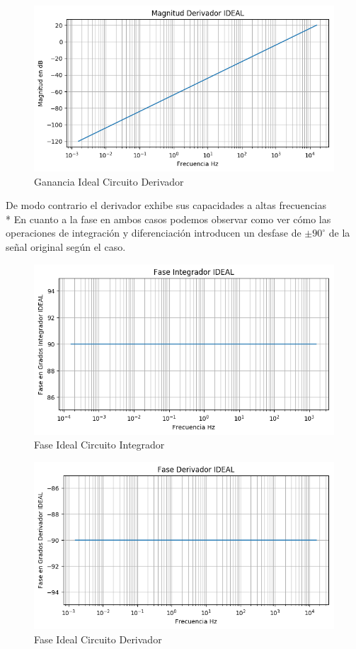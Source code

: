 \begin{figure}[H]
	\centering
	\includegraphics[width=\textwidth]{Ejercicio4/BODE-IDEAL-MAGNITUD-DERIVADOR.png}
	\caption{Ganancia Ideal Circuito Derivador}
\end{figure}
De modo contrario el derivador exhibe sus capacidades a altas frecuencias
\\*
En cuanto a la fase en ambos casos podemos observar como ver cómo las operaciones de integración y diferenciación introducen un desfase de $\pm90^{\circ}$ de la señal original según el caso. 
\begin{figure}[H]
	\centering
	\includegraphics[width=\textwidth]{Ejercicio4/BODE-IDEAL-FASE-INTEGRADOR.png}
	\caption{Fase Ideal Circuito Integrador}
\end{figure}

\begin{figure}[H]
	\includegraphics[width=\textwidth]{Ejercicio4/BODE-IDEAL-FASE-DERIVADOR.png}
	\caption{Fase Ideal Circuito Derivador}
\end{figure}

